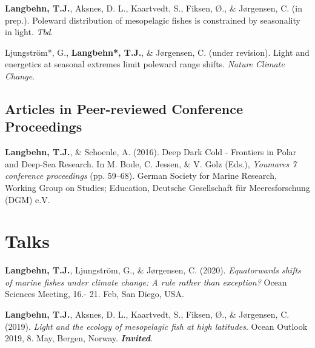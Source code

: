 \documentclass[11pt, a4paper]{awesome-cv}
\begin{document}
\leavevmode\hypertarget{ref-Langbehnh}{}%
\textbf{Langbehn, T.J.}, Aksnes, D. L., Kaartvedt, S., Fiksen, Ø., \&
Jørgensen, C. (in prep.). Poleward distribution of mesopelagic fishes is
constrained by seasonality in light. \emph{Tbd}.

\leavevmode\hypertarget{ref-Ljungstrom}{}%
Ljungström*, G., \textbf{Langbehn*, T.J.}, \& Jørgensen, C. (under
revision). Light and energetics at seasonal extremes limit poleward
range shifts. \emph{Nature Climate Change}.

\endgroup

\hypertarget{articles-in-peer-reviewed-conference-proceedings}{%
\subsection{Articles in Peer-reviewed Conference
Proceedings}\label{articles-in-peer-reviewed-conference-proceedings}}

\begingroup
\setlength{\parindent}{-0.5in}
\setlength{\leftskip}{0.5in}

\hypertarget{refs_proceedings}{}
\leavevmode\hypertarget{ref-Langbehn2016c}{}%
\textbf{Langbehn, T.J.}, \& Schoenle, A. (2016). Deep \textbar{} Dark
\textbar{} Cold - Frontiers in Polar and Deep-Sea Research. In M. Bode,
C. Jessen, \& V. Golz (Eds.), \emph{Youmares 7 conference proceedings}
(pp. 59--68). German Society for Marine Research, Working Group on
Studies; Education, Deutsche Gesellschaft für Meeresforschung (DGM) e.V.

\endgroup

\hypertarget{talks}{%
\section{Talks}\label{talks}}

\begingroup
\setlength{\parindent}{-0.5in}
\setlength{\leftskip}{0.5in}

\hypertarget{refs_talks}{}
\leavevmode\hypertarget{ref-Langbehn11}{}%
\textbf{Langbehn, T.J.}, Ljungström, G., \& Jørgensen, C. (2020).
\emph{Equatorwards shifts of marine fishes under climate change: A rule
rather than exception?} Ocean Sciences Meeting, 16.- 21. Feb, San Diego,
USA.

\leavevmode\hypertarget{ref-Langbehn6}{}%
\textbf{Langbehn, T.J.}, Aksnes, D. L., Kaartvedt, S., Fiksen, Ø., \&
Jørgensen, C. (2019). \emph{Light and the ecology of mesopelagic fish at
high latitudes}. Ocean Outlook 2019, 8. May, Bergen, Norway.
\emph{\textbf{Invited}}.
\end{document}
